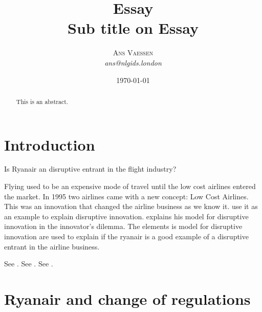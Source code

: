 \documentclass[a4paper, 11pt]{article}
\title{\textbf{Essay}\\Sub title on Essay}
\author{\textsc{Ans Vaessen}
\\{\textit{ans@nlgids.london}}}
\date{\today}
\begin{document}
\maketitle

\begin{abstract}
This is an abstract.
\end{abstract}

\vspace{30pt} %

\section*{Introduction}
Is Ryanair an disruptive entrant in the flight industry?


Flying used to be an expensive mode of travel until the low cost airlines entered the market. In 1995 two airlines came with a new concept: Low Cost Airlines. This was an innovation that changed the airline business as we know it. \cite{tiddbessant} use it as an example to explain disruptive innovation. \citep{Christensen97} explains his model for disruptive innovation in the innovator's dilemma. The elements is model for disruptive innovation are used to explain if the ryanair is a good example of a disruptive entrant in the airline business.


See \cite{Christensen97}.
See \citep{Christensen97}.
See \citep[p. 145]{Christensen97}.

\section{Ryanair and change of regulations}
\end{document}

